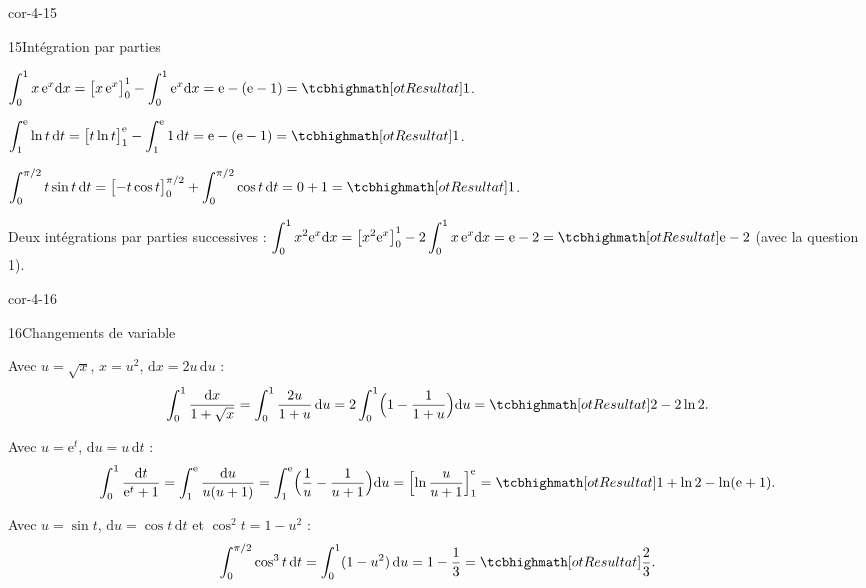 \begin{blocLivre}{cor-4-15}
\begin{corrige}{15}{Intégration par parties}
\begin{questions}
  \item $\displaystyle\int_{0}^{1}x\,\mathrm{e}^{x}\mathrm{d}x
    =\bigl[x\,\mathrm{e}^{x}\bigr]_{0}^{1}-\int_{0}^{1}\mathrm{e}^{x}\mathrm{d}x
    =\mathrm{e}-(\mathrm{e}-1)=\res{1}$.
  \item $\displaystyle\int_{1}^{\mathrm{e}}\ln t\,\mathrm{d}t
    =\bigl[t\ln t\bigr]_{1}^{\mathrm{e}}-\int_{1}^{\mathrm{e}}1\,\mathrm{d}t
    =\mathrm{e}-(\mathrm{e}-1)=\res{1}$.
  \item $\displaystyle\int_{0}^{\pi/2}t\sin t\,\mathrm{d}t
    =\bigl[-t\cos t\bigr]_{0}^{\pi/2}+\int_{0}^{\pi/2}\cos t\,\mathrm{d}t
    =0+1=\res{1}$.
  \item Deux intégrations par parties successives :
    $\displaystyle\int_{0}^{1}x^{2}\mathrm{e}^{x}\mathrm{d}x
    =\bigl[x^{2}\mathrm{e}^{x}\bigr]_{0}^{1}-2\int_{0}^{1}x\,\mathrm{e}^{x}\mathrm{d}x
    =\mathrm{e}-2=\res{\mathrm{e}-2}$ (avec la question 1).
\end{questions}
\end{corrige}
\end{blocLivre}

\begin{blocLivre}{cor-4-16}
\begin{corrige}{16}{Changements de variable}
\begin{questions}
  \item Avec $u=\sqrt{x}$, $x=u^{2}$, $\mathrm{d}x=2u\,\mathrm{d}u$ :
    \[
      \int_{0}^{1}\frac{\mathrm{d}x}{1+\sqrt{x}}
      =\int_{0}^{1}\frac{2u}{1+u}\,\mathrm{d}u
      =2\int_{0}^{1}\Bigl(1-\frac{1}{1+u}\Bigr)\mathrm{d}u
      =\res{2-2\ln2}.
    \]
  \item Avec $u=\mathrm{e}^{t}$, $\mathrm{d}u=u\,\mathrm{d}t$ :
    \[
      \int_{0}^{1}\frac{\mathrm{d}t}{\mathrm{e}^{t}+1}
      =\int_{1}^{\mathrm{e}}\frac{\mathrm{d}u}{u(u+1)}
      =\int_{1}^{\mathrm{e}}\Bigl(\frac1u-\frac{1}{u+1}\Bigr)\mathrm{d}u
      =\Bigl[\ln\frac{u}{u+1}\Bigr]_{1}^{\mathrm{e}}
      =\res{1+\ln2-\ln(\mathrm{e}+1)}.
    \]
  \item Avec $u=\sin t$, $\mathrm{d}u=\cos t\,\mathrm{d}t$ et
    $\cos^{2}t=1-u^{2}$ :
    \[
      \int_{0}^{\pi/2}\cos^{3}t\,\mathrm{d}t=\int_{0}^{1}(1-u^{2})\,\mathrm{d}u
      =1-\frac13=\res{\frac23}.
    \]
\end{questions}
\end{corrige}
\end{blocLivre}

